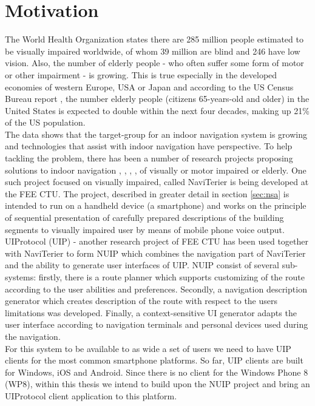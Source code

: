\section{Motivation}
The World Health Organization states there are 285 million people estimated to be visually impaired worldwide, of whom 39 million are blind and 246 have low vision. Also, the number of elderly people - who often suffer some form of motor or other impairment - is growing. This is true especially in the developed economies of western Europe, USA or Japan and according to the US Census Bureau report \cite{uscensus}, the number elderly people (citizens 65-years-old and older) in the United States is expected to double within the next four decades, making up 21\% of the US population.\\The data shows that the target-group for an indoor navigation system is growing and technologies that assist with indoor navigation have perspective.
To help tackling the problem, there has been a number of research projects proposing solutions to indoor navigation \cite{naviterier}, \cite{percept}, \cite{lopez}, \cite{luis}, \cite{riehle} of visually or motor impaired or elderly. One such project focused on visually impaired, called NaviTerier is being developed at the FEE CTU. The project, described in greater detail in section \ref{sec:nsa} is intended to run on a handheld device (a smartphone) and works on the principle of sequential presentation of carefully prepared descriptions of the building segments to visually impaired user by means of mobile phone voice output. UIProtocol (UIP) - another research project of FEE CTU has been used together with NaviTerier to form NUIP which combines the navigation part of NaviTerier and the ability to generate user interfaces of UIP. NUIP consist of several sub-systems: firstly, there is a route planner which supports customizing of the route according to the user abilities and preferences. Secondly,  a navigation description generator which creates description of the route with respect to the users limitations was developed. Finally, a context-sensitive UI generator \cite{macik2} adapts the user interface according to navigation terminals and personal devices used during the navigation.\\

For this system to be available to as wide a set of users we need to have UIP clients for the most common smartphone platforms. So far, UIP clients are built for Windows, iOS and Android. Since there is no client for the Windows Phone 8 (WP8), within this thesis we intend to build upon the NUIP project and bring an UIProtocol client application to this platform. 


